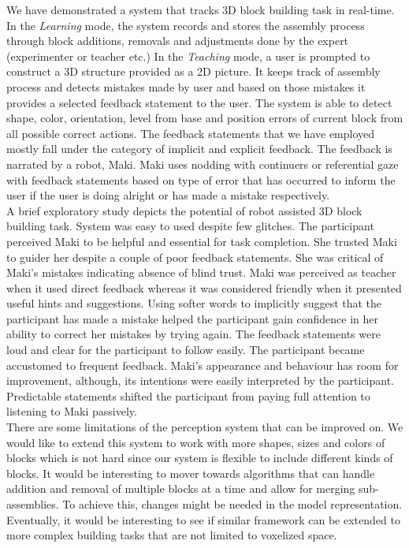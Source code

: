\label{chap:conclusion}
We have demonstrated a system that tracks 3D block building task in real-time. In the \emph{Learning} mode, the system records and stores the assembly process through block additions, removals and adjustments done by the expert (experimenter or teacher etc.) In the \emph{Teaching} mode, a user is prompted to construct a 3D structure provided as a 2D picture. It keeps track of assembly process and detects mistakes made by user and based on those mistakes it provides a selected feedback statement to the user. The system is able to detect shape, color, orientation, level from base and position errors of current block from all possible correct actions. The feedback statements that we have employed mostly fall under the category of implicit and explicit feedback. The feedback is narrated by a robot, Maki. Maki uses nodding with continuers or referential gaze with feedback statements based on type of error that has occurred to inform the user if the user is doing alright or has made a mistake respectively. \\
A brief exploratory study depicts the potential of robot assisted 3D block building task. System was easy to used despite few glitches. The participant perceived Maki to be helpful and essential for task completion. She trusted Maki to guider her despite a couple of poor feedback statements. She was critical of Maki's mistakes indicating absence of blind trust. Maki was perceived as teacher when it used direct feedback whereas it was considered friendly when it presented useful hints and suggestions. Using softer words to implicitly suggest that the participant has made a mistake helped the participant gain confidence in her ability to correct her mistakes by trying again. The feedback statements were loud and clear for the participant to follow easily. The participant became accustomed to frequent feedback. Maki's appearance and behaviour has room for improvement, although, its intentions were easily interpreted by the participant. Predictable statements shifted the participant from paying full attention to listening to Maki passively.\\
There are some limitations of the perception system that can be improved on. We would like to extend this system to work with more shapes, sizes and colors of blocks which is not hard since our system is flexible to include different kinds of blocks. It would be interesting to mover towards algorithms that can handle addition and removal of multiple blocks at a time and allow for merging sub-assemblies. To achieve this, changes might be needed in the model representation. Eventually, it would be interesting to see if similar framework can be extended to more complex building tasks that are not limited to voxelized space.\\
